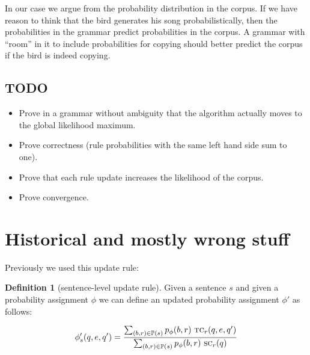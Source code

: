 \documentclass[12pt]{article}
\theoremstyle{definition}
\newtheorem{definition}{Definition}[section]
\begin{document}
In our case we argue from the probability distribution in the corpus. If we have reason to think that the bird generates his song probabilistically, then the probabilities in the grammar predict probabilities in the corpus. A grammar with ``room'' in it to include probabilities for copying should better predict the corpus if the bird is indeed copying.




\subsection{TODO}
\begin{itemize}
\item Prove in a grammar without ambiguity that the algorithm actually moves to the global likelihood maximum.
\item Prove correctness (rule probabilities with the same left hand side sum to one).
\item Prove that each rule update increases the likelihood of the corpus.
\item Prove convergence.
\end{itemize}








\section{Historical and mostly wrong stuff}




Previously we used this update rule:

\begin{definition}[sentence-level update rule]
  Given a sentence $s$ and given a probability assignment $\phi$ we can define an updated probability assignment $\phi'$ as follows:

  $$\phi_s'(q,e,q') = \frac{\sum_{(b,r)\in\mathbb{P}(s)}p_\phi(b,r)~\text{\textsc{tc}}_r(q,e,q')}{\sum_{(b,r)\in\mathbb{P}(s)}p_\phi(b,r)~\text{\textsc{sc}}_r(q)}$$
\end{definition}

%
\end{document}
